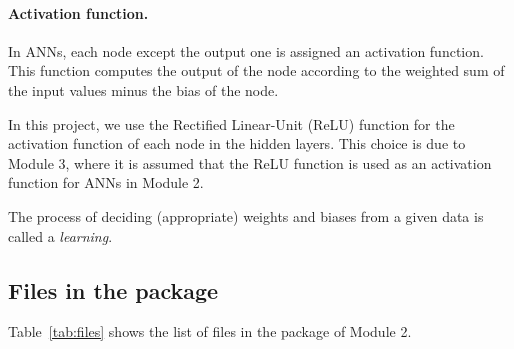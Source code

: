 \documentclass[11pt, titlepage, dvipdfmx, twoside]{article}
\newcommand{\tabref}[1]{Table~\ref{tab:#1}}
\begin{document}
\paragraph{Activation function.}
In ANNs, each node except the output one is assigned an activation function.
This function computes the output of the node
according to the weighted sum of the input values minus the bias of the node.

In this project, we use the Rectified Linear-Unit (ReLU) function
for the activation function of each node in the hidden layers.
This choice is due to Module 3, 
where it is assumed that the ReLU function is used
as an activation function for ANNs in Module 2.

\medskip

The process of deciding (appropriate) weights and biases
from a given data is called a {\em learning}.


\subsection{Files in the package}
\tabref{files} shows the list of files in the package of Module 2. 
\end{document}
